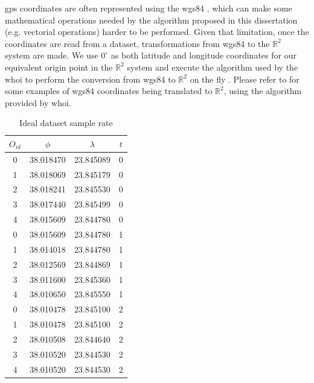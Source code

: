 \ac{gps} coordinates are often represented using the \ac{wgs84} \cite{wgs84}, which can make some mathematical
operations needed by the algorithm proposed in this dissertation (e.g. vectorial operations) harder to be performed.
Given that limitation, once the coordinates are read from a dataset, transformations from \ac{wgs84} to the
$\mathbb{R}^2$ system are made. We use $0^\circ$ as both latitude and longitude coordinates for our equivalent origin
point in the $\mathbb{R}^2$ system and execute the algorithm used by the \ac{whoi} to perform the conversion from
\ac{wgs84} to $\mathbb{R}^2$ on the fly \cite{latlogtoxy}. Please refer to  for some examples of
\ac{wgs84} coordinates being translated to $\mathbb{R}^2$, using the algorithm provided by \ac{whoi}.

\begin{table}[h!]
    \centering
    \begin{minipage}{0.5\textwidth}
        \centering
        \caption{Ideal dataset sample rate}
        \label{tbl:ideal_rate}
        \begin{tabular}{c c c c}
            \toprule
            \textbf{$O_{id}$} & \textbf{$\phi$} & \textbf{$\lambda$} & \textbf{$t$} \\
            \toprule
            0 & 38.018470 & 23.845089 & 0 \\
            1 & 38.018069 & 23.845179 & 0 \\
            2 & 38.018241 & 23.845530 & 0 \\
            3 & 38.017440 & 23.845499 & 0 \\
            4 & 38.015609 & 23.844780 & 0 \\
            \bottomrule
            0 & 38.015609 & 23.844780 & 1 \\
            1 & 38.014018 & 23.844780 & 1 \\
            2 & 38.012569 & 23.844869 & 1 \\
            3 & 38.011600 & 23.845360 & 1 \\
            4 & 38.010650 & 23.845550 & 1 \\
            \bottomrule
            0 & 38.010478 & 23.845100 & 2 \\
            1 & 38.010478 & 23.845100 & 2 \\
            2 & 38.010508 & 23.844640 & 2 \\
            3 & 38.010520 & 23.844530 & 2 \\
            4 & 38.010520 & 23.844530 & 2 \\

\end{tabular}
\end{minipage}
\end{table}

